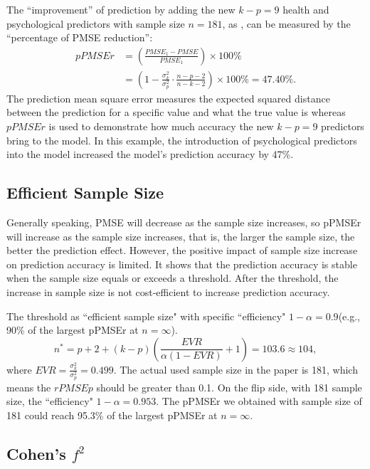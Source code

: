 The “improvement” of prediction by adding the new $k-p=9$ health and psychological predictors with sample size $n = 181$, as \cite{baker2008chronicpain}, can be measured by the “percentage of PMSE reduction”:
$$\begin{aligned}
pPMSEr &= \left(\frac{PMSE_1 - PMSE}{PMSE_1} \right)\times 100\%\\
&= \left(1 - \frac{\sigma_k^2}{\sigma_p^2} \cdot \frac{n-p-2}{n-k-2}\right)\times 100\% = 47.40\%.
\end{aligned}$$
The prediction mean square error measures the expected squared distance between the prediction for a specific value and what the true value is whereas $pPMSEr$ is used to demonstrate how much accuracy the new $k-p = 9$ predictors bring to the model. In this example, the introduction of psychological predictors into the model increased the model's prediction accuracy by 47\%.

\subsection{Efficient Sample Size}
Generally speaking, PMSE will decrease as the sample size increases, so pPMSEr will increase as the sample size increases, that is, the larger the sample size, the better the prediction effect. However, the positive impact of sample size increase on prediction accuracy is limited. It shows that the prediction accuracy is stable when the sample size equals or exceeds a threshold. After the threshold, the increase in sample size is not cost-efficient to increase prediction accuracy. 

The threshold as ``efficient sample size" with specific ``efficiency" $1-\alpha = 0.9 $(e.g., 90\% of the largest pPMSEr at $n=\infty$). 
$$
n^* = p+2+(k-p)\left(\frac{EVR}{\alpha(1-EVR)}+1\right) = 103.6\approx 104,
$$
where $EVR = \frac{\sigma_k^2}{\sigma_p^2}=0.499$.
The actual used sample size in the paper is 181, which means the $rPMSEp$ should be greater than 0.1. On the flip side, with 181 sample size, the ``efficiency" $1-\alpha = 0.953$. The pPMSEr we obtained with sample size of 181 could reach 95.3\% of the largest pPMSEr at $n=\infty$.


\subsection{Cohen's $f^2$}

